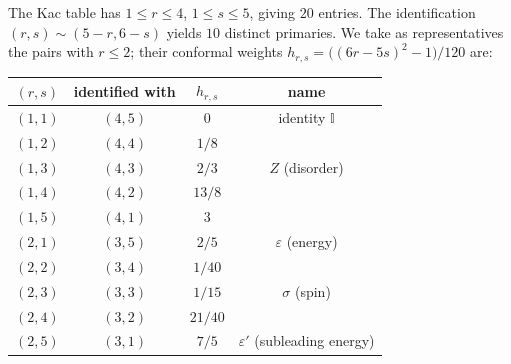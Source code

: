 \begin{computation}\label{comp:m65-primaries}
The Kac table has $1 \leq r \leq 4$, $1 \leq s \leq 5$, giving $20$ entries.
The identification $(r,s) \sim (5{-}r, 6{-}s)$ yields $10$ distinct primaries.
We take as representatives the pairs with $r \leq 2$; their conformal weights
$h_{r,s} = \bigl((6r-5s)^2 - 1\bigr)/120$ are:
\begin{center}
\renewcommand{\arraystretch}{1.2}
\begin{tabular}{cccc}
\hline
$(r,s)$ & identified with & $h_{r,s}$ & name \\
\hline
$(1,1)$ & $(4,5)$ & $0$ & identity $\mathbb{I}$ \\
$(1,2)$ & $(4,4)$ & $1/8$ & \\
$(1,3)$ & $(4,3)$ & $2/3$ & $Z$ (disorder) \\
$(1,4)$ & $(4,2)$ & $13/8$ & \\
$(1,5)$ & $(4,1)$ & $3$ & \\
$(2,1)$ & $(3,5)$ & $2/5$ & $\varepsilon$ (energy) \\
$(2,2)$ & $(3,4)$ & $1/40$ & \\
$(2,3)$ & $(3,3)$ & $1/15$ & $\sigma$ (spin) \\
$(2,4)$ & $(3,2)$ & $21/40$ & \\
$(2,5)$ & $(3,1)$ & $7/5$ & $\varepsilon'$ (subleading energy) \\
\hline
\end{tabular}
\end{center}
\end{computation}

